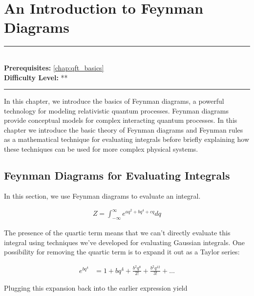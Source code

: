 \documentclass[book.tex]{subfiles}
\begin{document}
\chapter{An Introduction to Feynman Diagrams}

\label{chap:feynman_diagrams}
\noindent\rule{11cm}{0.4pt} \\
\textbf{Prerequisites:} \autoref{chap:qft_basics}  \\
\textbf{Difficulty Level:} ** \\
\noindent\rule{11cm}{0.4pt}
\vspace{5mm}

In this chapter, we introduce the basics of Feynman diagrams, a powerful technology for modeling relativistic quantum processes. Feynman diagrams provide conceptual models for complex interacting quantum processes. In this chapter we introduce the basic theory of Feynman diagrams and Feynman rules as a mathematical technique for evaluating integrals before briefly explaining how these techniques can be used for more complex physical systems.


\section{Feynman Diagrams for Evaluating Integrals}

In this section, we use Feynman diagrams to evaluate an integral. %

\begin{align}
    Z = \int_{-\infty}^{\infty} e^{a q^2 + b q^4 + cq} dq
\end{align}

The presence of the quartic term means that we can't directly evaluate this integral using techniques we've developed for evaluating Gaussian integrals. One possibility for removing the quartic term is to expand it out as a Taylor series:

\begin{align}
    e^{bq^4} &= 1 + bq^4 + \frac{b^2q^8}{2!} + \frac{b^2q^{12}}{3!} + \dotsc
\end{align}

Plugging this expansion back into the earlier expression yield
\end{document}
